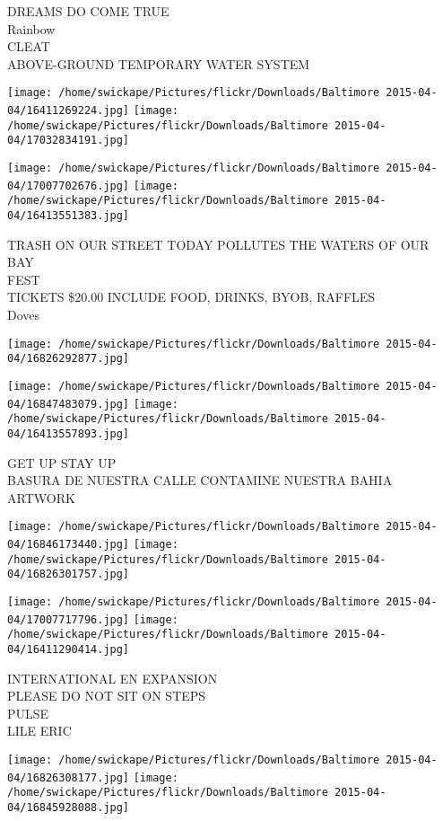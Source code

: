 \documentclass[10pt,letterpaper]{article}
\begin{document}
DREAMS DO COME TRUE\\
Rainbow\\
CLEAT\\
ABOVE{-}GROUND TEMPORARY WATER SYSTEM
\pagebreak

\texttt{[image: /home/swickape/Pictures/flickr/Downloads/Baltimore 2015-04-04/16411269224.jpg]}
\texttt{[image: /home/swickape/Pictures/flickr/Downloads/Baltimore 2015-04-04/17032834191.jpg]}

\texttt{[image: /home/swickape/Pictures/flickr/Downloads/Baltimore 2015-04-04/17007702676.jpg]}
\texttt{[image: /home/swickape/Pictures/flickr/Downloads/Baltimore 2015-04-04/16413551383.jpg]}

TRASH ON OUR STREET TODAY POLLUTES THE WATERS OF OUR BAY\\
FEST\\
TICKETS \$20.00 INCLUDE FOOD, DRINKS, BYOB, RAFFLES\\
Doves
\pagebreak

\texttt{[image: /home/swickape/Pictures/flickr/Downloads/Baltimore 2015-04-04/16826292877.jpg]}

\vspace{0.25in}
\texttt{[image: /home/swickape/Pictures/flickr/Downloads/Baltimore 2015-04-04/16847483079.jpg]}
\texttt{[image: /home/swickape/Pictures/flickr/Downloads/Baltimore 2015-04-04/16413557893.jpg]}

GET UP STAY UP\\
BASURA DE NUESTRA CALLE CONTAMINE NUESTRA BAHIA\\
ARTWORK
\pagebreak

\texttt{[image: /home/swickape/Pictures/flickr/Downloads/Baltimore 2015-04-04/16846173440.jpg]}
\texttt{[image: /home/swickape/Pictures/flickr/Downloads/Baltimore 2015-04-04/16826301757.jpg]}

\texttt{[image: /home/swickape/Pictures/flickr/Downloads/Baltimore 2015-04-04/17007717796.jpg]}
\texttt{[image: /home/swickape/Pictures/flickr/Downloads/Baltimore 2015-04-04/16411290414.jpg]}

INTERNATIONAL EN EXPANSION\\
PLEASE DO NOT SIT ON STEPS\\
PULSE\\
LILE ERIC
\pagebreak

\texttt{[image: /home/swickape/Pictures/flickr/Downloads/Baltimore 2015-04-04/16826308177.jpg]}
\texttt{[image: /home/swickape/Pictures/flickr/Downloads/Baltimore 2015-04-04/16845928088.jpg]}
\end{document}

